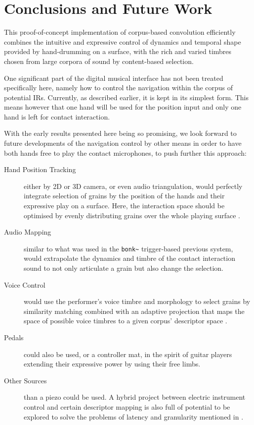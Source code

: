 \section{Conclusions and Future Work}\label{sec:future}

This proof-of-concept implementation of corpus-based convolution efficiently combines the intuitive and expressive control of dynamics and temporal shape provided by hand-drumming on a surface, with the rich and varied timbres chosen from large corpora of sound by content-based selection.


One significant part of the digital musical interface has not been treated specifically here, namely how to control the navigation within the corpus of potential IRs. Currently, as described earlier, it is kept in its simplest form. This means however that one hand will be used for the position input and only one hand is left for contact interaction.

With the early results presented here being so promising, we look forward to future developments of the navigation control by other means in order to have both hands free to play the contact microphones, to push further this approach:

\begin{description}
\item[Hand Position Tracking] either by 2D or 3D camera, or even audio triangulation, would perfectly integrate selection of grains by the position of the hands and their expressive play on a surface.  Here, the interaction space should be optimised by evenly distributing grains over the whole playing surface \cite{LallemandSchwarz-dafx2011-distribute}.
\item[Audio Mapping] similar to what was used in the \verb|bonk~| trigger-based previous system, would extrapolate the dynamics and timbre of the contact interaction sound to not only articulate a grain but also change the selection.
\item[Voice Control] would use the performer's voice timbre and morphology to select grains by similarity matching combined with an adaptive projection that maps the space of possible voice timbres to a given corpus' descriptor space \cite{StowellPlumbley-smc2010-timbre-remapping-regression-tree,Fasciani-si2013b}.
\item[Pedals] could also be used, or a controller mat, in the spirit of guitar players extending their expressive power by using their free limbs.
\item[Other Sources] than a piezo could be used. A hybrid project between electric instrument control and certain descriptor mapping is also full of potential to be explored to solve the problems of latency and granularity mentioned in \cite{TremblaySchwarz-nime2010-surfing-the-waves}.
\end{description}

